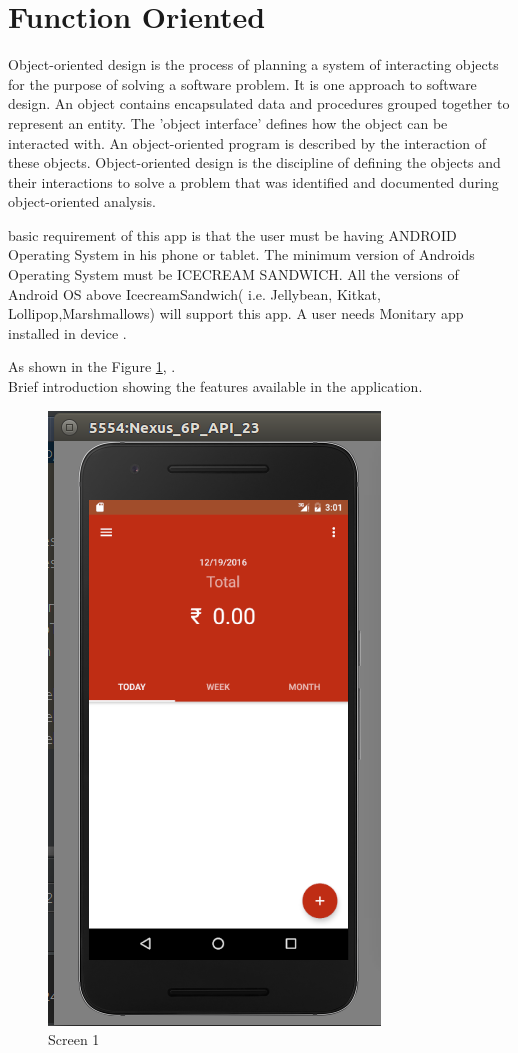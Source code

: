 
\section{Function Oriented}

Object-oriented design is the process of planning a system of interacting objects for the purpose of solving a software problem. It is one approach to software design. An object contains encapsulated data and procedures grouped together to represent an entity. The 'object interface' defines how the object can be interacted with. An object-oriented program is described by the interaction of these objects. Object-oriented design is the discipline of defining the objects and their interactions to solve a problem that was identified and documented during object-oriented analysis.

\iffalse
 basic requirement of this app is that the user must be having ANDROID
Operating System in his phone or tablet. The minimum version of Androids Operating
System must be ICECREAM SANDWICH. All the versions of Android OS above
IcecreamSandwich( i.e. Jellybean, Kitkat, Lollipop,Marshmallows) will support this
app. A user needs Monitary app installed in device .


\noindent As shown in the Figure \ref{fig:1}, .\\Brief introduction showing the features available in the application.

\begin{figure}[ht]
\centering
\includegraphics[scale=0.5]{images/s1.png}
\caption{Screen 1}
\label{fig:1}
\end{figure}


